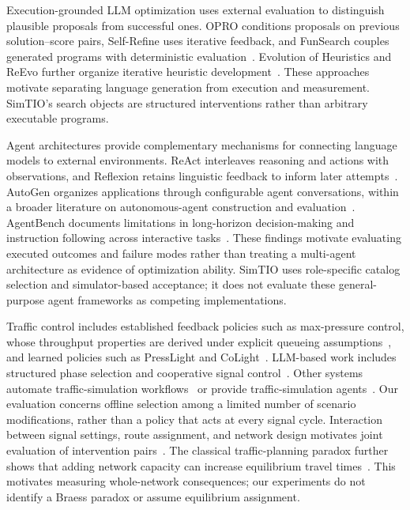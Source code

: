 \documentclass[11pt]{article}
\begin{document}
Execution-grounded LLM optimization uses external evaluation to distinguish plausible proposals from successful ones. OPRO conditions proposals on previous solution--score pairs, Self-Refine uses iterative feedback, and FunSearch couples generated programs with deterministic evaluation~\cite{yang2024opro,madaan2023selfrefine,romera2024funsearch}. Evolution of Heuristics and ReEvo further organize iterative heuristic development~\cite{liu2024eoh,ye2024reevo}. These approaches motivate separating language generation from execution and measurement. SimTIO's search objects are structured interventions rather than arbitrary executable programs.

Agent architectures provide complementary mechanisms for connecting language models to external environments. ReAct interleaves reasoning and actions with observations, and Reflexion retains linguistic feedback to inform later attempts~\cite{yao2023react,shinn2023reflexion}. AutoGen organizes applications through configurable agent conversations, within a broader literature on autonomous-agent construction and evaluation~\cite{wu2024autogen,wang2024agentsurvey}. AgentBench documents limitations in long-horizon decision-making and instruction following across interactive tasks~\cite{liu2024agentbench}. These findings motivate evaluating executed outcomes and failure modes rather than treating a multi-agent architecture as evidence of optimization ability. SimTIO uses role-specific catalog selection and simulator-based acceptance; it does not evaluate these general-purpose agent frameworks as competing implementations.

Traffic control includes established feedback policies such as max-pressure control, whose throughput properties are derived under explicit queueing assumptions~\cite{varaiya2013maxpressure}, and learned policies such as PressLight and CoLight~\cite{wei2019presslight,wei2019colight}. LLM-based work includes structured phase selection and cooperative signal control~\cite{lai2025llmlight,yuan2026collmlight}. Other systems automate traffic-simulation workflows~\cite{anonymous2024,anonymous2026} or provide traffic-simulation agents~\cite{du2025trafficsimagent}. Our evaluation concerns offline selection among a limited number of scenario modifications, rather than a policy that acts at every signal cycle. Interaction between signal settings, route assignment, and network design motivates joint evaluation of intervention pairs~\cite{meneguzzer1997combined,yang1998networkdesign}. The classical traffic-planning paradox further shows that adding network capacity can increase equilibrium travel times~\cite{braess2005paradox}. This motivates measuring whole-network consequences; our experiments do not identify a Braess paradox or assume equilibrium assignment.
\end{document}

